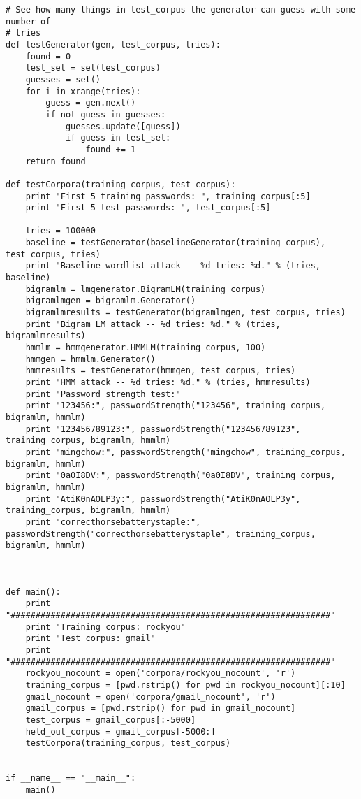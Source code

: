 \documentclass{amsart}
\theoremstyle{definition}
\theoremstyle{remark}
\numberwithin{equation}{section}
\begin{document}
\begin{lstlisting}
# See how many things in test_corpus the generator can guess with some number of
# tries
def testGenerator(gen, test_corpus, tries):
    found = 0
    test_set = set(test_corpus)
    guesses = set()
    for i in xrange(tries):
        guess = gen.next()
        if not guess in guesses:
            guesses.update([guess])
            if guess in test_set:
                found += 1
    return found

def testCorpora(training_corpus, test_corpus):
    print "First 5 training passwords: ", training_corpus[:5]
    print "First 5 test passwords: ", test_corpus[:5]

    tries = 100000
    baseline = testGenerator(baselineGenerator(training_corpus), test_corpus, tries)
    print "Baseline wordlist attack -- %d tries: %d." % (tries, baseline)
    bigramlm = lmgenerator.BigramLM(training_corpus)
    bigramlmgen = bigramlm.Generator()
    bigramlmresults = testGenerator(bigramlmgen, test_corpus, tries)
    print "Bigram LM attack -- %d tries: %d." % (tries, bigramlmresults)
    hmmlm = hmmgenerator.HMMLM(training_corpus, 100)
    hmmgen = hmmlm.Generator()
    hmmresults = testGenerator(hmmgen, test_corpus, tries)
    print "HMM attack -- %d tries: %d." % (tries, hmmresults)
    print "Password strength test:"
    print "123456:", passwordStrength("123456", training_corpus, bigramlm, hmmlm)
    print "123456789123:", passwordStrength("123456789123", training_corpus, bigramlm, hmmlm)
    print "mingchow:", passwordStrength("mingchow", training_corpus, bigramlm, hmmlm)
    print "0a0I8DV:", passwordStrength("0a0I8DV", training_corpus, bigramlm, hmmlm)
    print "AtiK0nAOLP3y:", passwordStrength("AtiK0nAOLP3y", training_corpus, bigramlm, hmmlm)
    print "correcthorsebatterystaple:", passwordStrength("correcthorsebatterystaple", training_corpus, bigramlm, hmmlm)

 

def main():
    print "################################################################"
    print "Training corpus: rockyou"
    print "Test corpus: gmail"
    print "################################################################"
    rockyou_nocount = open('corpora/rockyou_nocount', 'r')
    training_corpus = [pwd.rstrip() for pwd in rockyou_nocount][:10]
    gmail_nocount = open('corpora/gmail_nocount', 'r')
    gmail_corpus = [pwd.rstrip() for pwd in gmail_nocount]
    test_corpus = gmail_corpus[:-5000]
    held_out_corpus = gmail_corpus[-5000:]
    testCorpora(training_corpus, test_corpus)


if __name__ == "__main__":
    main()
\end{lstlisting}
\newpage
\end{document}
